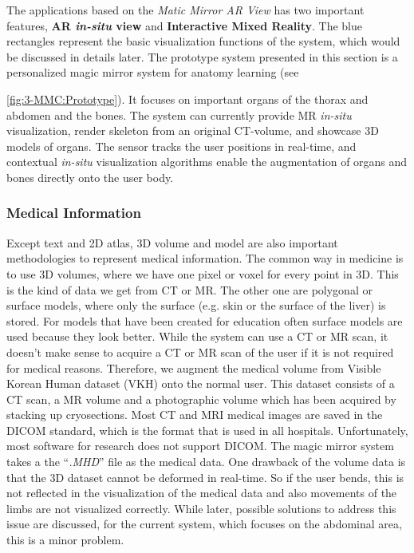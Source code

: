 The applications based on the \textit{Matic Mirror AR View} has two important features, \textbf{AR \textit{in-situ} view} and \textbf{Interactive Mixed Reality}. The blue rectangles represent the basic visualization functions of the system, which would be discussed in details later. The prototype system presented in this section is a personalized magic mirror system for anatomy learning (see \figurename{\ref{fig:3-MMC:Prototype}). It focuses on important organs of the thorax and abdomen and the bones. The system can currently provide MR \textit{in-situ} visualization, render skeleton from an original CT-volume, and showcase 3D models of organs. The sensor tracks the user positions in real-time, and contextual \textit{in-situ} visualization algorithms enable the augmentation of organs and bones directly onto the user body.

\subsubsection{Medical Information}
Except text and 2D atlas, 3D volume and model are also important methodologies to represent medical information. The common way in medicine is to use 3D volumes, where we have one pixel or voxel for every point in 3D. This is the kind of data we get from CT or MR. The other one are polygonal or surface models, where only the surface (e.g. skin or the surface of the liver) is stored. For models that have been created for education often surface models are used because they look better.
While the system can use a CT or MR scan, it doesn't make sense to acquire a CT or MR scan of the user if it is not required for medical reasons. Therefore, we augment the medical volume from Visible Korean Human dataset (VKH) \cite{Park2006} onto the normal user. This dataset consists of a CT scan, a MR volume and a photographic volume which has been acquired by stacking up cryosections. 
Most CT and MRI medical images are saved in the DICOM standard, which is the format that is used in all hospitals. Unfortunately, most software for research does not support DICOM. The magic mirror system takes a the ``\textit{\*.MHD}'' file as the medical data. One drawback of the volume data is that the 3D dataset cannot be deformed in real-time. So if the user bends, this is not reflected in the visualization of the medical data and also movements of the limbs are not visualized correctly. While later, possible solutions to address this issue are discussed, for the current system, which focuses on the abdominal area, this is a minor problem.

}
